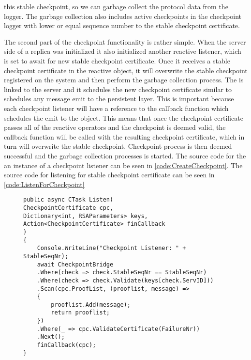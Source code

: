 this stable checkpoint, so we can garbage collect the protocol data from the logger. The garbage collection also includes active checkpoints in the checkpoint logger with lower or equal sequence number to the stable checkpoint certificate. 

The second part of the checkpoint functionality is rather simple. When the server side of a replica was initialized it also initialized another reactive listener, which is set to await for new stable checkpoint certificate. Once it receives a stable checkpoint certificate in the reactive  object, it will overwrite the stable checkpoint registered on the system and then perform the garbage collection process. The  is linked to the server and it schedules the new checkpoint certificate similar to schedules any message emit to the persistent layer. This is important because each checkpoint listener will have a reference to the callback function which schedules the emit to the  object. This means that once the checkpoint certificate passes all of the reactive operators and the checkpoint is deemed valid, the callback function will be called with the resulting checkpoint certificate, which in turn will overwrite the stable checkpoint. Checkpoint process is then deemed successful and the garbage collection processes is started. The source code for the an instance of a checkpoint listener can be seen in \autoref{code:CreateCheckpoint}. The source code for listening for stable checkpoint certificate can be seen in \autoref{code:ListenForCheckpoint}

\begin{figure}[H]
	\centering
	\begin{lstlisting}[label = code:CreateCheckpoint, caption=Listener for checkpoint messages, captionpos = b, basicstyle=\scriptsize]
public async CTask Listen(
CheckpointCertificate cpc, 
Dictionary<int, RSAParameters> keys, 
Action<CheckpointCertificate> finCallback
)
{
    Console.WriteLine("Checkpoint Listener: " + StableSeqNr);
    await CheckpointBridge
    .Where(check => check.StableSeqNr == StableSeqNr)
    .Where(check => check.Validate(keys[check.ServID]))
    .Scan(cpc.ProofList, (prooflist, message) =>
    {
        prooflist.Add(message);
        return prooflist;
    })
    .Where(_ => cpc.ValidateCertificate(FailureNr))
    .Next();
    finCallback(cpc);
}
    \end{lstlisting}
\end{figure}

